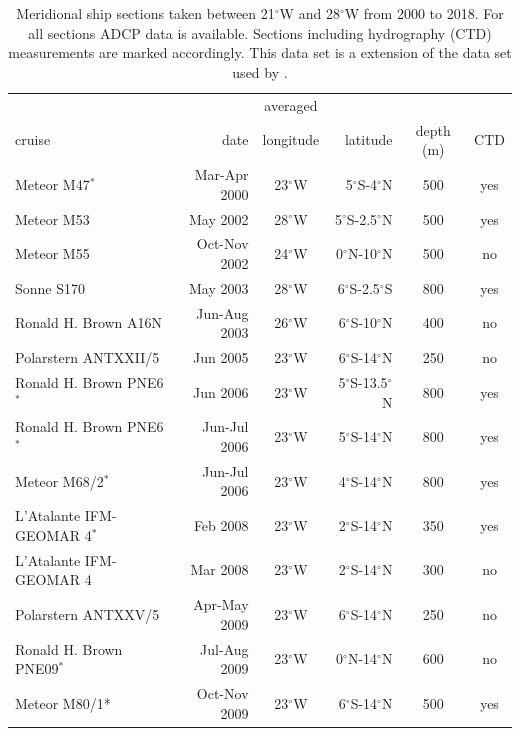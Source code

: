 \documentclass[os, manuscript]{copernicus}
\begin{document}
\section{}    %
\begin{table}[t]
	\caption{Meridional ship sections taken between 21$^{\circ}$W and 28$^{\circ}$W from 2000 to 2018. For all sections ADCP data is available. Sections including hydrography (CTD) measurements are marked accordingly. This data set is a extension of the data set used by \cite{Burmeister2020}.}
	\centering
	\begin{tabular}{lrcrcc}
		\tophline
		& &averaged & & &\\
		cruise & date & longitude&latitude & depth (m) & CTD\\
		\middlehline
		Meteor M47$ ^{*} $ & Mar-Apr 2000 & 23$^{\circ}$W & 5$^{\circ}$S-4$^{\circ}$N & 500 & yes \\
		Meteor M53 & May 2002 & 28$^{\circ}$W & 5$^{\circ}$S-2.5$^{\circ}$N & 500 & yes \\
		Meteor M55 & Oct-Nov 2002 & 24$^{\circ}$W & 0$^{\circ}$N-10$^{\circ}$N & 500 & no \\
		Sonne S170 & May 2003 & 28$^{\circ}$W & 6$^{\circ}$S-2.5$^{\circ}$S & 800 & yes \\
		Ronald H. Brown A16N & Jun-Aug 2003 & 26$^{\circ}$W & 6$^{\circ}$S-10$^{\circ}$N & 400 & no \\
		Polarstern ANTXXII/5 & Jun 2005 & 23$^{\circ}$W & 6$^{\circ}$S-14$^{\circ}$N & 250 & no \\
		Ronald H. Brown PNE6$ ^{*} $ & Jun 2006 & 23$^{\circ}$W & 5$^{\circ}$S-13.5$^{\circ}$N & 800 & yes  \\
		Ronald H. Brown PNE6$ ^{*} $ & Jun-Jul 2006 & 23$^{\circ}$W & 5$^{\circ}$S-14$^{\circ}$N & 800 & yes  \\
		Meteor M68/2$ ^{*} $ & Jun-Jul 2006 & 23$^{\circ}$W & 4$^{\circ}$S-14$^{\circ}$N & 800 & yes  \\
		L'Atalante IFM-GEOMAR 4$ ^{*} $ & Feb 2008 &  23$^{\circ}$W & 2$^{\circ}$S-14$^{\circ}$N & 350 & yes \\
		L'Atalante IFM-GEOMAR 4 & Mar 2008 &  23$^{\circ}$W & 2$^{\circ}$S-14$^{\circ}$N & 300 & no  \\
		Polarstern ANTXXV/5 & Apr-May 2009 & 23$^{\circ}$W & 6$^{\circ}$S-14$^{\circ}$N & 250  & no \\
		Ronald H. Brown PNE09$ ^{*} $ & Jul-Aug 2009 & 23$^{\circ}$W & 0$^{\circ}$N-14$^{\circ}$N & 600 & no \\
		Meteor M80/1* & Oct-Nov 2009 & 23$^{\circ}$W & 6$^{\circ}$S-14$^{\circ}$N & 500 & yes  \\

\end{tabular}
\end{table}
\end{document}

